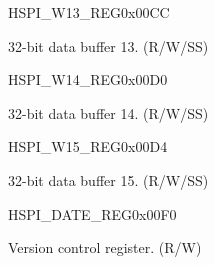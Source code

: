 \begin{register}{H}{SPI\_W13\_REG}{0x00CC}\label{regdesc:SPIW13REG}
%
\regnewline%
\begin{regdesc}\begin{reglist}
\label{fielddesc:SPIBUF13}\item [SPI\_BUF13] 32-bit data buffer 13. (R/W/SS)
\end{reglist}\end{regdesc}
\end{register}


\begin{register}{H}{SPI\_W14\_REG}{0x00D0}\label{regdesc:SPIW14REG}
%
\regnewline%
\begin{regdesc}\begin{reglist}
\label{fielddesc:SPIBUF14}\item [SPI\_BUF14] 32-bit data buffer 14. (R/W/SS)
\end{reglist}\end{regdesc}
\end{register}


\begin{register}{H}{SPI\_W15\_REG}{0x00D4}\label{regdesc:SPIW15REG}
%
\regnewline%
\begin{regdesc}\begin{reglist}
\label{fielddesc:SPIBUF15}\item [SPI\_BUF15] 32-bit data buffer 15. (R/W/SS)
\end{reglist}\end{regdesc}
\end{register}


\begin{register}{H}{SPI\_DATE\_REG}{0x00F0}\label{regdesc:SPIDATEREG}
%
%
\regnewline%
\begin{regdesc}\begin{reglist}
\label{fielddesc:SPIDATE}\item [SPI\_DATE] Version control register. (R/W)
\end{reglist}\end{regdesc}
\end{register}
